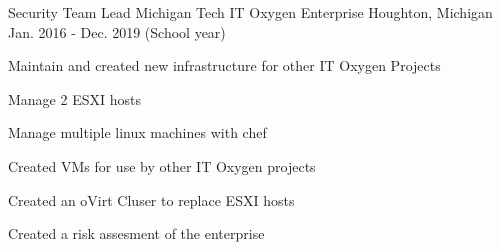 \begin{cventries}
 \cventry
    {Security Team Lead} %
    {Michigan Tech IT Oxygen Enterprise} %
    {Houghton, Michigan} %
    {Jan. 2016 - Dec. 2019 (School year)} %
    {
      \begin{cvitems} %
        \item {Maintain and created new infrastructure for other IT Oxygen Projects}
        \item {Manage 2 ESXI hosts}
        \item {Manage multiple linux machines with chef}
        \item {Created VMs for use by other IT Oxygen projects}
	\item {Created an oVirt Cluser to replace ESXI hosts}
	\item {Created a risk assesment of the enterprise}
      \end{cvitems}
    }
\end{cventries}
